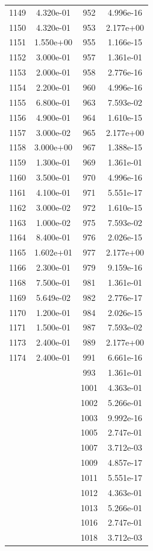 \documentclass[12pt]{article}
\begin{document}
\begin{longtable}{@{}cccc@{}}
1149 & 4.320e-01 & 952 & 4.996e-16 \\
1150 & 4.320e-01 & 953 & 2.177e+00 \\
1151 & 1.550e+00 & 955 & 1.166e-15 \\
1152 & 3.000e-01 & 957 & 1.361e-01 \\
1153 & 2.000e-01 & 958 & 2.776e-16 \\
1154 & 2.200e-01 & 960 & 4.996e-16 \\
1155 & 6.800e-01 & 963 & 7.593e-02 \\
1156 & 4.900e-01 & 964 & 1.610e-15 \\
1157 & 3.000e-02 & 965 & 2.177e+00 \\
1158 & 3.000e+00 & 967 & 1.388e-15 \\
1159 & 1.300e-01 & 969 & 1.361e-01 \\
1160 & 3.500e-01 & 970 & 4.996e-16 \\
1161 & 4.100e-01 & 971 & 5.551e-17 \\
1162 & 3.000e-02 & 972 & 1.610e-15 \\
1163 & 1.000e-02 & 975 & 7.593e-02 \\
1164 & 8.400e-01 & 976 & 2.026e-15 \\
1165 & 1.602e+01 & 977 & 2.177e+00 \\
1166 & 2.300e-01 & 979 & 9.159e-16 \\
1168 & 7.500e-01 & 981 & 1.361e-01 \\
1169 & 5.649e-02 & 982 & 2.776e-17 \\
1170 & 1.200e-01 & 984 & 2.026e-15 \\
1171 & 1.500e-01 & 987 & 7.593e-02 \\
1173 & 2.400e-01 & 989 & 2.177e+00 \\
1174 & 2.400e-01 & 991 & 6.661e-16 \\
 &  & 993 & 1.361e-01 \\
 &  & 1001 & 4.363e-01 \\
 &  & 1002 & 5.266e-01 \\
 &  & 1003 & 9.992e-16 \\
 &  & 1005 & 2.747e-01 \\
 &  & 1007 & 3.712e-03 \\
 &  & 1009 & 4.857e-17 \\
 &  & 1011 & 5.551e-17 \\
 &  & 1012 & 4.363e-01 \\
 &  & 1013 & 5.266e-01 \\
 &  & 1016 & 2.747e-01 \\
 &  & 1018 & 3.712e-03 \\

\end{longtable}
\end{document}
